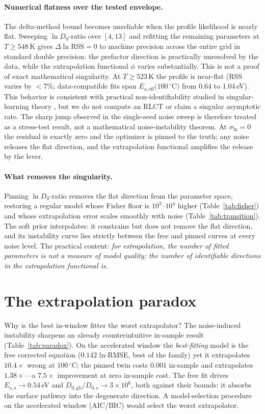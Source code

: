 \documentclass{article}
\newcommand{\sln}{\sigma_{\ln}}
\newcommand{\dln}{\Delta\ln}
\begin{document}
\paragraph{Numerical flatness over the tested envelope.} The delta-method bound
becomes unreliable when the profile likelihood is nearly flat. Sweeping
$\ln D_{0}$-ratio over
$[4,13]$ and refitting the remaining parameters at $T\ge548$\,K gives
$\dln\text{RSS}=0$ to machine precision across the entire grid in standard
double precision: the prefactor direction is practically unresolved by the
data, while the extrapolation functional $\phi$ varies substantially. This is
not a proof of exact mathematical singularity. At $T\ge523$\,K the profile is near-flat
(RSS varies by $<7\%$; data-compatible fits span
$E_{\mathrm{a,eff}}(100\,^\circ$C$)$ from $0.64$ to $1.04$\,eV). This behavior
is consistent with practical non-identifiability studied in singular-learning
theory \citep{watanabe09,watanabe18}, but we do not compute an RLCT or claim a
singular asymptotic rate. The sharp jump observed in the single-seed noise
sweep is therefore treated as a stress-test result, not a mathematical
noise-instability theorem. At
$\sln=0$ the residual is exactly zero and the optimizer is pinned to the truth;
any noise releases the flat direction, and the extrapolation functional
amplifies the release by the lever.

\paragraph{What removes the singularity.} Pinning $\ln D_{0}$-ratio removes the
flat direction from the parameter space, restoring a regular model whose Fisher
floor is $10^3$--$10^4$ higher (Table~\ref{tab:fisher}) and whose extrapolation
error scales smoothly with noise (Table~\ref{tab:transition}). The soft prior
interpolates: it constrains but does not remove the flat direction, and its
instability curve lies strictly between the free and pinned curves at every noise
level. The practical content: \emph{for extrapolation, the number of fitted
parameters is not a measure of model quality; the number of identifiable
directions in the extrapolation functional is.}
\section{The extrapolation paradox}

Why is the best in-window fitter the worst extrapolator? The noise-induced
instability
sharpens an already counterintuitive in-sample result
(Table~\ref{tab:paradox}). On the accelerated window the \emph{best-fitting}
model is the free corrected equation ($0.142$ ln-RMSE, best of the family) yet
it extrapolates $10.4\times$ wrong at $100\,^\circ$C; the pinned twin costs
$0.001$ in-sample and extrapolates $1.38\times$---a $7.5\times$ improvement at
zero in-sample cost. The free fit drives $E_{\mathrm{a,s}}\to0.54$\,eV and
$D_{0,\mathrm{gb}}/D_{0,\mathrm{s}}\to3\times10^6$, both against their bounds:
it absorbs the surface pathway into the degenerate direction. A model-selection
procedure on the accelerated window (AIC/BIC) would select the worst
extrapolator.
\end{document}
